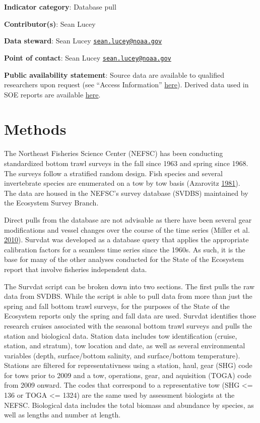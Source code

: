 \documentclass[
]{book}
\begin{document}
\textbf{Indicator category}: Database pull

\textbf{Contributor(s)}: Sean Lucey

\textbf{Data steward}: Sean Lucey \href{mailto:sean.lucey@noaa.gov}{\nolinkurl{sean.lucey@noaa.gov}}

\textbf{Point of contact}: Sean Lucey \href{mailto:sean.lucey@noaa.gov}{\nolinkurl{sean.lucey@noaa.gov}}

\textbf{Public availability statement}: Source data are available to qualified researchers upon request (see ``Access Information'' \href{https://inport.nmfs.noaa.gov/inport/item/22560}{here}). Derived data used in SOE reports are available \href{https://comet.nefsc.noaa.gov/erddap/tabledap/group_landings_soe_v1.html}{here}.

\hypertarget{methods-41}{%
\section{Methods}\label{methods-41}}

The Northeast Fisheries Science Center (NEFSC) has been conducting standardized bottom trawl surveys
in the fall since 1963 and spring since 1968. The surveys follow a stratified random design. Fish
species and several invertebrate species are enumerated on a tow by tow basis (Azarovitz \protect\hyperlink{ref-Azarovitz1981}{1981}).\\
The data are housed in the NEFSC's survey database (SVDBS) maintained by the Ecosystem Survey Branch.

Direct pulls from the database are not advisable as there have been several gear modifications and
vessel changes over the course of the time series (Miller et al. \protect\hyperlink{ref-Miller_2010}{2010}). Survdat was developed as a database
query that applies the appropriate calibration factors for a seamless time series since the 1960s.
As such, it is the base for many of the other analyses conducted for the State of the Ecosystem
report that involve fisheries independent data.

The Survdat script can be broken down into two sections. The first pulls the raw data from SVDBS.
While the script is able to pull data from more than just the spring and fall bottom trawl surveys,
for the purposes of the State of the Ecosystem reports only the spring and fall data are used.
Survdat identifies those research cruises associated with the seasonal bottom trawl surveys and pulls
the station and biological data. Station data includes tow identification (cruise, station,
and stratum), tow location and date, as well as several environmental variables (depth, surface/bottom salinity,
and surface/bottom temperature). Stations are filtered for representativness using a station, haul, gear
(SHG) code for tows prior to 2009 and a tow, operations, gear, and aquisition (TOGA) code from 2009
onward. The codes that correspond to a representative tow (SHG \textless= 136 or TOGA \textless= 1324) are the same
used by assessment biologists at the NEFSC. Biological data includes the total biomass and abundance
by species, as well as lengths and number at length.
\end{document}

